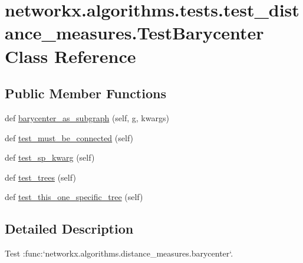 \hypertarget{classnetworkx_1_1algorithms_1_1tests_1_1test__distance__measures_1_1TestBarycenter}{}\section{networkx.\+algorithms.\+tests.\+test\+\_\+distance\+\_\+measures.\+Test\+Barycenter Class Reference}
\label{classnetworkx_1_1algorithms_1_1tests_1_1test__distance__measures_1_1TestBarycenter}
\subsection*{Public Member Functions}
\begin{DoxyCompactItemize}
\item 
def \hyperlink{classnetworkx_1_1algorithms_1_1tests_1_1test__distance__measures_1_1TestBarycenter_abb02cfd8036bc7b6bc6b406405138b56}{barycenter\+\_\+as\+\_\+subgraph} (self, g, kwargs)
\item 
def \hyperlink{classnetworkx_1_1algorithms_1_1tests_1_1test__distance__measures_1_1TestBarycenter_a8cb7d2a815d94d6e41011e5c8f7d29ee}{test\+\_\+must\+\_\+be\+\_\+connected} (self)
\item 
def \hyperlink{classnetworkx_1_1algorithms_1_1tests_1_1test__distance__measures_1_1TestBarycenter_aa89f68d71c4bb333289498fe3d15dba4}{test\+\_\+sp\+\_\+kwarg} (self)
\item 
def \hyperlink{classnetworkx_1_1algorithms_1_1tests_1_1test__distance__measures_1_1TestBarycenter_a6fb1cd23206b29509dfc7cfdf386de51}{test\+\_\+trees} (self)
\item 
def \hyperlink{classnetworkx_1_1algorithms_1_1tests_1_1test__distance__measures_1_1TestBarycenter_a27affb6ef4fc2896e8446a800b7395c0}{test\+\_\+this\+\_\+one\+\_\+specific\+\_\+tree} (self)
\end{DoxyCompactItemize}


\subsection{Detailed Description}
\begin{DoxyVerb}Test :func:`networkx.algorithms.distance_measures.barycenter`.\end{DoxyVerb}
 

